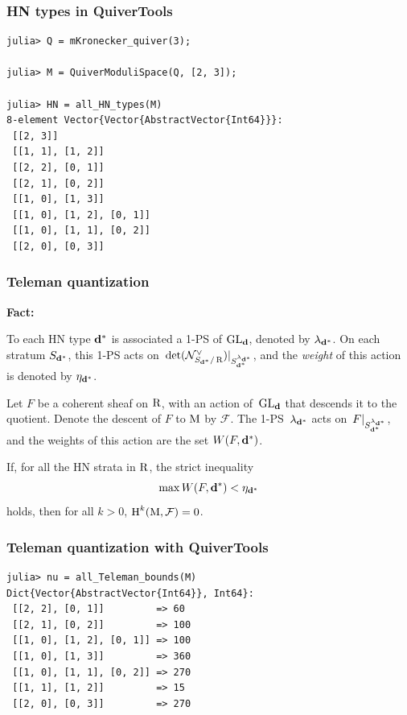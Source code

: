 \documentclass{beamer}
\begin{document}
\begin{frame}[fragile]
    \frametitle{HN types in QuiverTools}
\begin{lstlisting}
julia> Q = mKronecker_quiver(3);

julia> M = QuiverModuliSpace(Q, [2, 3]);

julia> HN = all_HN_types(M)
8-element Vector{Vector{AbstractVector{Int64}}}:
 [[2, 3]]
 [[1, 1], [1, 2]]
 [[2, 2], [0, 1]]
 [[2, 1], [0, 2]]
 [[1, 0], [1, 3]]
 [[1, 0], [1, 2], [0, 1]]
 [[1, 0], [1, 1], [0, 2]]
 [[2, 0], [0, 3]]
\end{lstlisting}
\end{frame}

\begin{frame}
    \frametitle{Teleman quantization}
\textbf{Fact:}

To each HN type $\mathbf{d}^*$ is associated a 1-PS of $\operatorname{GL}_{\mathbf{d}}$,
denoted by $\lambda_{\mathbf{d}^*}$.
On each stratum $S_{\mathbf{d}^*}$, this 1-PS acts
on~$\det(\mathcal{N}^{\vee}_{S_{\mathbf{d}^*}/\operatorname{R}})|_{S_{\mathbf{d}^*}^{\lambda_{\mathbf{d}^*}}}$,
and the \emph{weight} of this action is denoted by $\eta_{\mathbf{d}^*}$. \pause

Let $F$ be a coherent sheaf on $\operatorname{R}$, with an action of~$\operatorname{GL}_{\mathbf{d}}$
that descends it to the quotient.
Denote the descent of $F$ to $\operatorname{M}$ by $\mathcal{F}$. \pause
The 1-PS~$\lambda_{\mathbf{d}^*}$ acts on~$F|_{S_{\mathbf{d}^*}^{\lambda_{\mathbf{d}^*}}}$,
and the weights of this action are the set $W(F, \mathbf{d}^*)$. \pause

\begin{theorem}
If, for all the HN strata in $\operatorname{R}$, the strict inequality
\[\max W(F, \mathbf{d}^*) < \eta_{\mathbf{d}^*}\]
holds, then for all $k > 0$, $\operatorname{H}^k(\operatorname{M}, \mathcal{F}) = 0$.
\end{theorem}
\end{frame}

\begin{frame}[fragile]
    \frametitle{Teleman quantization with QuiverTools}
\small{
\begin{lstlisting}
julia> nu = all_Teleman_bounds(M)
Dict{Vector{AbstractVector{Int64}}, Int64}:
 [[2, 2], [0, 1]]         => 60
 [[2, 1], [0, 2]]         => 100
 [[1, 0], [1, 2], [0, 1]] => 100
 [[1, 0], [1, 3]]         => 360
 [[1, 0], [1, 1], [0, 2]] => 270
 [[1, 1], [1, 2]]         => 15
 [[2, 0], [0, 3]]         => 270
\end{lstlisting}
}
\end{frame}
\end{document}
